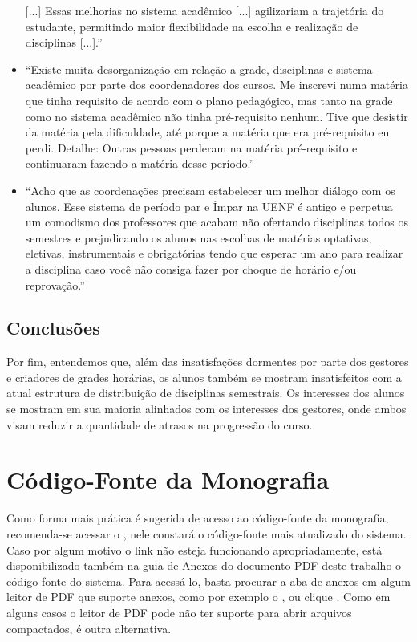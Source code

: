 \begin{apendicesenv}
\begin{itemize}
          [...]
          Essas melhorias no sistema acadêmico [...] agilizariam a trajetória do estudante, permitindo maior flexibilidade na escolha e realização de disciplinas [...].''
    \item ``Existe muita desorganização em relação a grade, disciplinas e sistema acadêmico por parte dos coordenadores dos cursos. Me inscrevi numa matéria que tinha requisito de acordo com o plano pedagógico, mas tanto na grade como no sistema acadêmico não tinha pré-requisito nenhum. Tive que desistir da matéria pela dificuldade, até porque a matéria que era pré-requisito eu perdi. Detalhe: Outras pessoas perderam na matéria pré-requisito e continuaram fazendo a matéria desse período.''
    \item ``Acho que as coordenações precisam estabelecer um melhor diálogo com os alunos. Esse sistema de período par e Ímpar na UENF é antigo e perpetua um comodismo dos professores que acabam não ofertando disciplinas todos os semestres e prejudicando os alunos nas escolhas de matérias optativas, eletivas, instrumentais e obrigatórias tendo que esperar um ano para realizar a disciplina caso você não consiga fazer por choque de horário e/ou reprovação.''
  \end{itemize}

  \section*{Conclusões} \label{sec:Conclusões}

  Por fim, entendemos que, além das insatisfações dormentes por parte dos gestores e criadores de grades horárias, os alunos também se mostram insatisfeitos com a atual estrutura de distribuição de disciplinas semestrais. Os interesses dos alunos se mostram em sua maioria alinhados com os interesses dos gestores, onde ambos visam reduzir a quantidade de atrasos na progressão do curso.

  \chapter{Código-Fonte da Monografia} \label{apendice:CodigoFonte}

  Como forma mais prática é sugerida de acesso ao código-fonte da monografia, recomenda-se acessar o , nele constará o código-fonte mais atualizado do sistema. Caso por algum motivo o link não esteja funcionando apropriadamente, está disponibilizado também na guia de Anexos do documento PDF deste trabalho o código-fonte do sistema. Para acessá-lo, basta procurar a aba de anexos em algum leitor de PDF que suporte anexos, como por exemplo o , ou clique . Como em alguns casos o leitor de PDF pode não ter suporte para abrir arquivos compactados,  é outra alternativa.


\end{apendicesenv}
